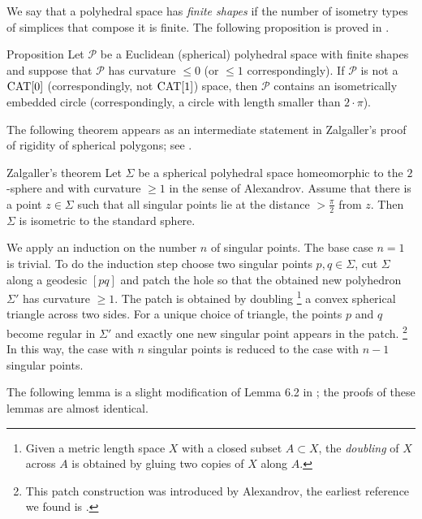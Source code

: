 \documentclass[oneside,a4paper]{article}
\begin{document}
We say that a polyhedral space has \emph{finite shapes} if the number of isometry types of simplices that compose it is finite.
The following proposition is proved in  \cite[II. 4.17]{bridson-haefliger}.

\begin{thm}{Proposition}\label{geodesic2pi} Let $\mathcal P$ be a Euclidean  (spherical) polyhedral space with finite shapes and suppose that $\mathcal P$ has curvature $\le 0$ (or $\le 1$ correspondingly).
If $\mathcal P$ is not a $\mathrm{CAT}[0]$ (correspondingly, not $\mathrm{CAT}[1]$) space, 
then $\mathcal P$ contains an isometrically embedded
circle (correspondingly, a circle with length smaller than $2{\cdot}\pi$).
\end{thm}

The following theorem appears as an intermediate statement
in Zalgaller's proof of rigidity of spherical polygons;
see \cite{zalgaller}.

\begin{thm}{Zalgaller's theorem}\label{thm:rigid-sphere-2D}
Let $\Sigma$ be a spherical polyhedral space homeomorphic to the $2$-sphere
and with curvature $\ge 1$ in the sense of Alexandrov.
Assume that there is a point $z\in \Sigma$ such that all singular points lie at the distance $>\tfrac\pi2$ from $z$.
Then $\Sigma$ is isometric to the standard sphere.

\end{thm}


We apply an induction on the number $n$ of singular points.
The base case $n=1$ is trivial.
To do the induction step
choose two singular points $p,q\in\Sigma$,
cut $\Sigma$ along a geodesic $[pq]$
and patch the hole so that the obtained new polyhedron $\Sigma'$ has curvature $\ge 1$.
The patch is obtained by doubling%
\footnote{Given a metric length space $X$ with a closed subset $A\subset X$,
the \emph{doubling} of $X$ across $A$ is obtained by gluing two copies of $X$ along $A$.}
 a convex spherical triangle across two sides.
For a unique choice of triangle, the points $p$ and $q$ become regular in $\Sigma'$
and exactly one new singular point appears in the patch.%
\footnote{This patch construction was introduced by Alexandrov,
the earliest reference we found is
\cite[VI, \S7]{alexandrov1948}.}
In this way, the case with $n$ singular points is reduced to the case with $n-1$ singular points.
\qeds

The following lemma is a slight modification of Lemma 6.2 in \cite{allcock};
the proofs of these lemmas are almost identical.
\end{document}

